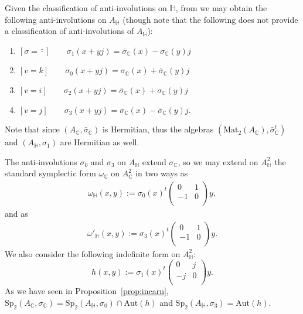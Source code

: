 \documentclass[oneside,11pt]{amsart}
\theoremstyle{definition}
\theoremstyle{remark}
\numberwithin{thm}{section}
\numberwithin{equation}{section}
\begin{document}
Given the classification of anti-involutions on $\mathbb{H}$, from \cite[Proposition A.37]{ABRRW} we may obtain the following anti-involutions on $A_{\mathbb{H}}$ (though note that the following does not provide a classification of anti-involutions of $A_{\mathbb{H}}$): 
\begin{enumerate}
        \item $ [\sigma = {\bar{\cdot}} ] \qquad \sigma_1(x+yj)=\bar{\sigma}_{\mathbb{C}}(x)-\sigma_{\mathbb{C}}(y)j$ 
        \item $ [v=k] \qquad \sigma_0(x+yj)={\sigma}_{\mathbb{C}}(x)+\bar{\sigma}_{\mathbb{C}}(y)j$
        \item $ [v=i] \qquad \sigma_2(x+yj)=\bar{\sigma}_{\mathbb{C}}(x)+\sigma_{\mathbb{C}}(y)j$
        \item $[v=j] \qquad \sigma_3(x+yj)={\sigma}_{\mathbb{C}}(x)-\bar{\sigma}_{\mathbb{C}}(y)j$.
\end{enumerate}

Note that since $({{A}_{\mathbb{C}}},\bar{\sigma}_\mathbb{C})$ is Hermitian, thus the algebras $(\mathrm{Mat}_2(A_\mathbb{C}),\bar\sigma_\mathbb{C}^t)$ and $({{A}_{\mathbb{H}}},{{\sigma }_{1}})$ are Hermitian as well.

The anti-involutions $\sigma_0$ and $\sigma_3$ on $A_\mathbb H$ extend $\sigma_\mathbb C$, so we may extend on $A_{\mathbb{H}}^{2}$ the standard symplectic form $\omega_\mathbb{C}$ on $A_{\mathbb{C}}^{2}$ in two ways as
\begin{align}
    {{\omega }_{\mathbb{H}}}(x,y):={{\sigma }_{0}}{(x)}^t\left( \begin{matrix}
   0 & 1  \\
   -1 & 0  \\
\end{matrix} \right)y,
\end{align}
and as
\begin{align}
    {\omega'_{\mathbb{H}}}(x,y):={{\sigma }_{3}}{(x)}^t\left( \begin{matrix}
   0 & 1  \\
   -1 & 0  \\
\end{matrix} \right)y.
\end{align}
We also consider the following indefinite form on $A_{\mathbb{H}}^{2}$:
\[h(x,y):={{\sigma }_{1}}{{(x)}^{t}}\left( \begin{matrix}
   0 & j  \\
   -j & 0  \\
\end{matrix} \right)y.\]
As we have seen in Proposition~\ref{prop:incarn}, $\mathrm{Sp}_2(A_{\mathbb C},\sigma_{\mathbb C})=\mathrm{Sp}_2(A_\mathbb H,\sigma_0)\cap\mathrm{Aut}(h)$ and $\mathrm{Sp}_2(A_\mathbb H,\sigma_3)= \mathrm{Aut}(h)$.
\end{document}
